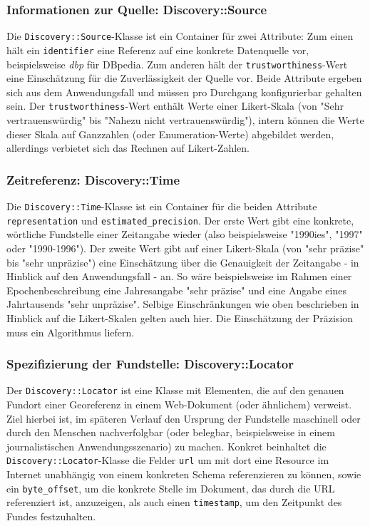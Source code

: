 \subsubsection{Informationen zur Quelle: Discovery::Source}
Die \texttt{Discovery::Source}-Klasse ist ein Container für zwei Attribute: Zum einen hält ein \texttt{identifier} eine Referenz auf eine konkrete Datenquelle vor, beispielsweise \textit{dbp} für DBpedia. Zum anderen hält der \texttt{trustworthiness}-Wert eine Einschätzung für die Zuverlässigkeit der Quelle vor. Beide Attribute ergeben sich aus dem Anwendungsfall und müssen pro Durchgang konfigurierbar gehalten sein. Der \texttt{trustworthiness}-Wert enthält Werte einer Likert-Skala (von "Sehr vertrauenswürdig" bis "Nahezu nicht vertrauenswürdig"), intern können die Werte dieser Skala auf Ganzzahlen (oder Enumeration-Werte) abgebildet werden, allerdings verbietet sich das Rechnen auf Likert-Zahlen.

\subsubsection{Zeitreferenz: Discovery::Time}
Die \texttt{Discovery::Time}-Klasse ist ein Container für die beiden Attribute \texttt{representation} und \texttt{estimated\_precision}. Der erste Wert gibt eine konkrete, wörtliche Fundstelle einer Zeitangabe wieder (also beispielsweise "1990ies", "1997" oder "1990-1996"). Der zweite Wert gibt auf einer Likert-Skala (von "sehr präzise" bis "sehr unpräzise") eine Einschätzung über die Genauigkeit der Zeitangabe - in Hinblick auf den Anwendungsfall - an. So wäre beispielsweise im Rahmen einer Epochenbeschreibung eine Jahresangabe "sehr präzise" und eine Angabe eines Jahrtausends "sehr unpräzise". Selbige Einschränkungen wie oben beschrieben in Hinblick auf die Likert-Skalen gelten auch hier. Die Einschätzung der Präzision muss ein Algorithmus liefern.

\subsubsection{Spezifizierung der Fundstelle: Discovery::Locator}
Der \texttt{Discovery::Locator} ist eine Klasse mit Elementen, die auf den genauen Fundort einer Georeferenz in einem Web-Dokument (oder ähnlichem) verweist. Ziel hierbei ist, im späteren Verlauf den Ursprung der Fundstelle maschinell oder durch den Menschen nachverfolgbar (oder belegbar, beispielsweise in einem journalistischen Anwendungsszenario) zu machen. Konkret beinhaltet die \texttt{Discovery::Locator}-Klasse die Felder \texttt{url} um mit dort eine Resource im Internet unabhängig von einem konkreten Schema referenzieren zu können, sowie ein \texttt{byte\_offset}, um die konkrete Stelle im Dokument, das durch die URL referenziert ist, anzuzeigen, als auch einen \texttt{timestamp}, um den Zeitpunkt des Fundes festzuhalten.
  
